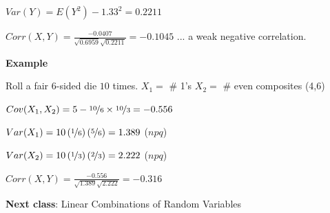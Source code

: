 $ Var(Y)=E(Y^2)-1.33^2=0.2211 $

$ Corr(X,Y)=\frac{-0.0407}{\sqrt{0.6959}\sqrt{0.2211}}=-0.1045 $ ... a weak
negative correlation.

\textbf{Example}

Roll a fair $6$-sided die $ 10 $ times.
$ X_1= $ \# 1's
$ X_2= $ \# even composites (4,6)

$ Cov(X_1,X_2)=5-\nicefrac{10}{6}\times \nicefrac{10}{3}=-0.556 $

$ Var(X_1)=10\left( \nicefrac{1}{6} \right)\left( \nicefrac{5}{6} \right)=1.389 $ ($ npq $)

$ Var(X_2)=10\left( \nicefrac{1}{3} \right)\left( \nicefrac{2}{3} \right)=2.222 $ ($ npq $)

$ Corr(X,Y)=\frac{-0.556}{\sqrt{1.389}\sqrt{2.222}}=-0.316 $

\textbf{Next class}: Linear Combinations of Random Variables
